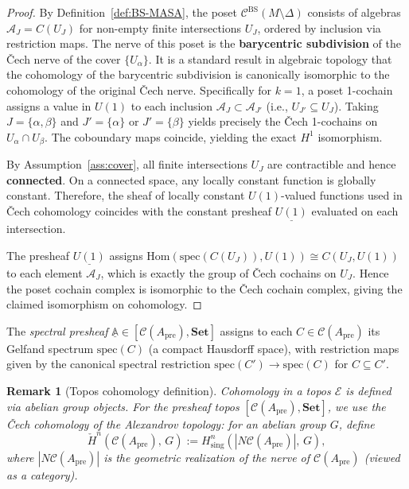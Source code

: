 \documentclass[11pt]{article}
\newtheorem{remark}[theorem]{Remark}
\begin{document}
\begin{proof}
By Definition~\ref{def:BS-MASA}, the poset $\mathcal{C}^{\mathrm{BS}}(M \setminus \Delta)$
consists of algebras $\mathcal{A}_J = C(U_J)$ for non-empty finite intersections $U_J$,
ordered by inclusion via restriction maps. The nerve of this poset is the
\textbf{barycentric subdivision} of the \v{C}ech nerve of the cover $\{U_\alpha\}$.
It is a standard result in algebraic topology that the cohomology of the
barycentric subdivision is canonically isomorphic to the cohomology of the
original \v{C}ech nerve. Specifically for $k=1$, a poset 1-cochain assigns a value
in $U(1)$ to each inclusion $\mathcal{A}_J \subset \mathcal{A}_{J'}$ (i.e., $U_{J'} \subseteq U_J$).
Taking $J = \{\alpha, \beta\}$ and $J' = \{\alpha\}$ or $J' = \{\beta\}$ yields precisely
the \v{C}ech 1-cochains on $U_\alpha \cap U_\beta$. The coboundary maps coincide,
yielding the exact $H^1$ isomorphism.

By Assumption~\ref{ass:cover}, all finite intersections $U_J$
are contractible and hence \textbf{connected}. On a connected space, any locally
constant function is globally constant. Therefore, the sheaf of locally constant
$U(1)$-valued functions used in \v{C}ech cohomology coincides with the constant
presheaf $\underline{U(1)}$ evaluated on each intersection.

The presheaf $\underline{U(1)}$ assigns
$\mathrm{Hom}(\mathrm{spec}(C(U_J)), U(1)) \cong C(U_J, U(1))$ to each element
$\mathcal{A}_J$, which is exactly the group of \v{C}ech cochains on $U_J$.
Hence the poset cochain complex is isomorphic to the \v{C}ech cochain complex,
giving the claimed isomorphism on cohomology.
\end{proof}

The \emph{spectral presheaf} $\underline{\mathbb{A}} \in
[\mathcal{C}(A_{\mathrm{pre}}), \mathbf{Set}]$ assigns to each $C \in \mathcal{C}(A_{\mathrm{pre}})$
its Gelfand spectrum $\mathrm{spec}(C)$ (a compact Hausdorff space), with
restriction maps given by the canonical spectral restriction
$\mathrm{spec}(C') \to \mathrm{spec}(C)$ for $C \subseteq C'$.

\begin{remark}[Topos cohomology definition]
\label{rem:cohomology}
Cohomology in a topos $\mathcal{E}$ is defined via abelian group objects.
For the presheaf topos $[\mathcal{C}(A_{\mathrm{pre}}), \mathbf{Set}]$, we use the
\emph{Čech cohomology of the Alexandrov topology}: for an abelian group
$G$, define
\[
  \check{H}^n(\mathcal{C}(A_{\mathrm{pre}}),\, G)
  := H^n_{\mathrm{sing}}(|N\mathcal{C}(A_{\mathrm{pre}})|,\, G),
\]
where $|N\mathcal{C}(A_{\mathrm{pre}})|$ is the geometric realization of the nerve of
$\mathcal{C}(A_{\mathrm{pre}})$ (viewed as a category).
\end{remark}
\end{document}
